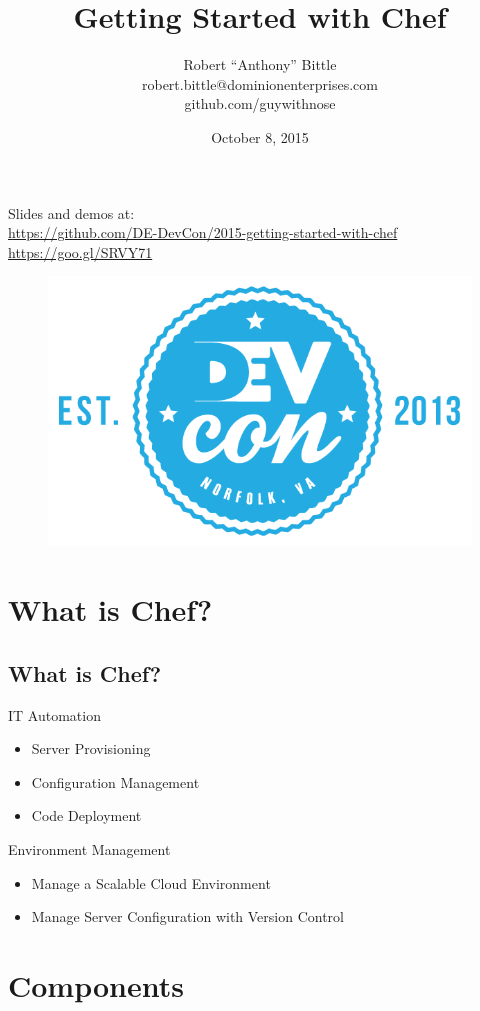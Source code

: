 \documentclass{beamer}
\title[Getting Started with Chef]{Getting Started with Chef}
\author{\hspace{12pt}Robert “Anthony” Bittle\hspace{12pt}\\\hspace{12pt}robert.bittle@dominionenterprises.com\hspace{12pt}\\\hspace{12pt}github.com/guywithnose\hspace{12pt}}
\date{October 8, 2015}
\begin{document}
    \begin{frame}
        \titlepage
        Slides and demos at:\\
        \href{https://github.com/DE-DevCon/2015-getting-started-with-chef}{https://github.com/DE-DevCon/2015-getting-started-with-chef}
        \href{https://goo.gl/SRVY71}{https://goo.gl/SRVY71}
        \begin{figure}[htpb]
            \centering
            \includegraphics[width=0.1\linewidth]{devcon.png}
        \end{figure}
    \end{frame}

    \section{What is Chef?}
    \subsection{What is Chef?}
    \begin{frame}{IT Automation}
        \begin{itemize}
            \item Server Provisioning
            \item Configuration Management
            \item Code Deployment
        \end{itemize}
    \end{frame}
    \begin{frame}{Environment Management}
        \begin{itemize}
            \item Manage a Scalable Cloud Environment
            \item Manage Server Configuration with Version Control
        \end{itemize}
    \end{frame}
    \section{Components}
\end{document}
